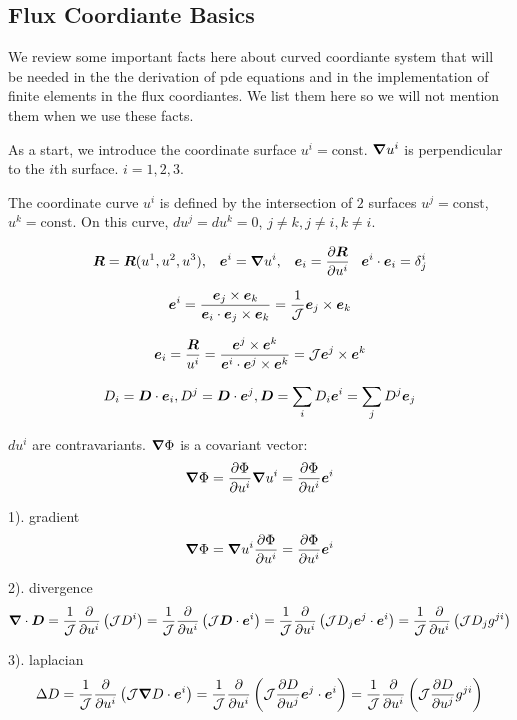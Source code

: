 \documentclass{report}
\newcommand{\bm}[1]{\mbox{\boldmath $#1$}}
\newcommand{\ff}[2]{\frac{#1}{#2}}
\newcommand{\pp}[2]{\frac{\partial{#1}}{\partial{#2}}}
\begin{document}
\begin{appendices}
\section{Flux Coordiante Basics}
\label{App:coor}
We review some important facts here about curved coordiante system 
that will be needed in the the derivation of pde equations and 
in the implementation of finite elements in the flux coordiantes.
We list them here so we will not mention them when we use these facts.

As a start, we introduce the coordinate surface $u^i=\mbox{const}$.
$\bm{\nabla} u^i$ is perpendicular to the $i$th surface.
$i=1,2,3$.

The coordinate curve $u^i$
is defined by the intersection of $2$ surfaces 
$u^j=\mbox{const}$, $u^k=\mbox{const}$.
On this curve, $du^j = du^k = 0$, $j\neq k, j\neq i, k\neq i$.

$$
\bm{R} = \bm{R} (u^1, u^2, u^3),
\;\;\;
\bm{e}^i =\bm{\nabla}u^i,
\;\;\;
\bm{e}_i = \pp{\bm{R}}{u^i}
\;\;\;
\bm{e}^i \cdot \bm{e}_i = \delta_j^i
$$

$$
\bm{e}^i = \ff{ \bm{e}_j \times \bm{e}_k }{ \bm{e}_i \cdot \bm{e}_j \times \bm{e}_k }
         = \ff{1}{\cal J} \bm{e}_j \times \bm{e}_k
$$

$$
\bm{e}_i = \ff{\bm{R}}{u^i}
         = \ff{ \bm{e}^j \times \bm{e}^k }{ \bm{e}^i \cdot \bm{e}^j \times \bm{e}^k }
         = {\cal J} \bm{e}^j \times \bm{e}^k
$$

$$
D_i = \bm{D} \cdot \bm{e}_i,
D^j = \bm{D} \cdot \bm{e}^j,
\bm{D} = \sum_i D_i \bm{e}^i = \sum_j D^j \bm{e}_j 
$$

$du^i$ are contravariants.
$\bm{\nabla}\Phi$ is a covariant vector: 
$$\bm{\nabla}\Phi = \pp{\Phi}{u^i} \bm{\nabla}u^i = \pp{\Phi}{u^i} \bm{e}^i$$

1). gradient
$$\bm{\nabla}\Phi = \bm{\nabla}u^i \pp{\Phi}{u^i} 
                  = \pp{\Phi}{u^i} \bm{e}^i
$$

2). divergence
$$
\bm{\nabla} \cdot \bm{D} = \ff{1}{\cal J} \pp{}{u^i} \left( {\cal J} D^i \right)
                         = \ff{1}{\cal J} \pp{}{u^i} \left( {\cal J} \bm{D} \cdot \bm{e}^i \right)
                         = \ff{1}{\cal J} \pp{}{u^i} \left( {\cal J} D_j \bm{e}^j \cdot \bm{e}^i \right)
                         = \ff{1}{\cal J} \pp{}{u^i} \left( {\cal J} D_j g^{ji} \right)
$$

3). laplacian
$$
\Delta D = \ff{1}{\cal J} \pp{}{u^i} \left( {\cal J} \bm{\nabla} D \cdot \bm{e}^i \right)
         = \ff{1}{\cal J} \pp{}{u^i} \left( {\cal J} \pp{D}{u^j} \bm{e}^j \cdot \bm{e}^i \right)
         = \ff{1}{\cal J} \pp{}{u^i} \left( {\cal J} \pp{D}{u^j} g^{ji} \right)
$$


\end{appendices}
\end{document}
